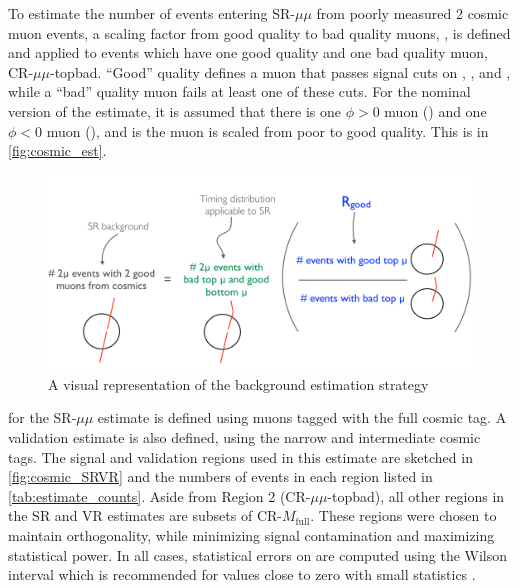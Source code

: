 To estimate the number of events entering SR-$\mu\mu$ from poorly measured 2 cosmic muon events, a scaling factor from good quality to bad quality muons, \rgood, is defined and applied to events which have one good quality and one bad quality muon, CR-$\mu\mu$-topbad. ``Good'' quality defines a muon that passes signal cuts on \nprecision, \nphi, and \chiCB, while a ``bad'' quality muon fails at least one of these cuts. For the nominal version of the estimate, it is assumed that there is one $\phi > 0$ muon (\mt) and one $\phi < 0$ muon (\mb), and \mt is the muon is scaled from poor to good quality. This is  in \autoref{fig:cosmic_est}.

\begin{figure}[!ht]
\centering
\includegraphics[width=.8\textwidth]{figures/cosmics/background_sketch.png}
\caption{A visual representation of the background estimation strategy}
\label{fig:cosmic_est}
\end{figure}

\rgood for the SR-$\mu\mu$ estimate is defined using muons tagged with the full cosmic tag. A validation estimate is also defined, using the narrow and intermediate cosmic tags. The signal and validation regions used in this estimate are sketched in \autoref{fig:cosmic_SRVR} and the numbers of events in each region listed in \autoref{tab:estimate_counts}. Aside from Region 2 (CR-$\mu\mu$-topbad), all other regions in the SR and VR estimates are subsets of CR-$M_{\textrm{full}}$. These regions were chosen to maintain orthogonality, while minimizing signal contamination and maximizing statistical power. In all cases, statistical errors on \rgood are computed using the Wilson interval which is recommended for values close to zero with small statistics \cite{ROOTAsymmErrors}. 

